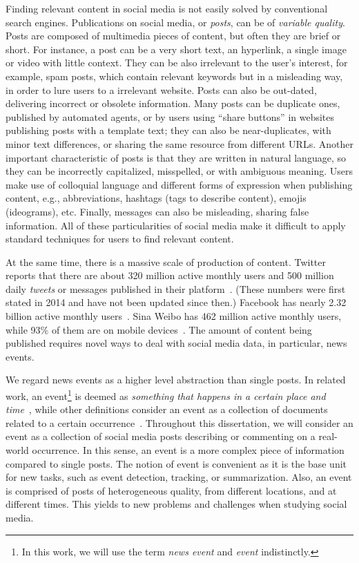 
Finding relevant content in social media is not easily solved by conventional
search engines.
%
Publications on social media, or {\em posts}, can be of {\em variable quality}.
%
Posts are composed of multimedia pieces of content, but often they are brief or
short.
%
For instance, a post can be a very short text, an hyperlink, a single image or
video with little context.
%
They can be also irrelevant to the user's interest, for example, spam posts,
which contain relevant keywords but in a misleading way, in order to lure users
to a irrelevant website. 
%
Posts can also be out-dated, delivering incorrect or obsolete information. 
%
Many posts can be duplicate ones, published by automated agents, or by users
using ``share buttons'' in websites publishing posts with a template text; 
%
they can also be near-duplicates, with minor text differences, or sharing the
same resource from different URLs.
%
Another important characteristic of posts is that they are written in natural
language, so they can be incorrectly capitalized, misspelled, or with ambiguous
meaning.
%
Users make use of colloquial language and different forms of expression when
publishing content, e.g., abbreviations, hashtags (tags to describe content),
emojis (ideograms), etc.
%
Finally, messages can also be misleading, sharing false information.
%
All of these particularities of social media make it difficult to apply standard
techniques for users to find relevant content.


At the same time, there is a massive scale of production of content. 
%
Twitter reports that there are about 320 million active monthly users and 500
million daily {\em tweets} or messages published in their
platform~\cite{twitter2014}. 
%
(These numbers were first stated in 2014 and have not been updated since then.)
%
Facebook has nearly 2.32 billion active monthly users~\cite{fbnewsroom}. 
%
Sina Weibo has 462 million active monthly users, while 93\% of them are on
mobile devices~\cite{chinawatch}.
%
The amount of content being published requires novel ways to deal with social
media data, in particular, news events.



We regard news events as a higher level abstraction than single
posts.
%
In related work, an event\footnote{In this work, we will use the term {\em news
event} and {\em event} indistinctly.} is deemed as {\em something that happens
in a certain place and time}~\cite{yang1999learning}, while other definitions
consider an event as a collection of documents related to a certain
occurrence~\cite{Becker:2010:LSM:1718487.1718524}.
%
Throughout this dissertation, we will consider an event as a collection of
social media posts describing or commenting on a real-world occurrence.
%
In this sense, an event is a more complex piece of information compared to
single posts.
%
The notion of event is convenient as it is the base unit for new tasks, such as
event detection, tracking, or summarization.
%
Also, an event is comprised of posts of heterogeneous quality, from different
locations, and at different times.
%
This yields to new problems and challenges when studying social media.

